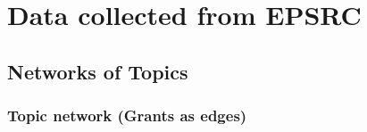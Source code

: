 {}
\renewcommand*{\arraystretch}{1.5}

\appendix

\chapter{Data collected from EPSRC}
\label{appendix:data}

\section{Networks of Topics}

\subsection{Topic network (Grants as edges)}

